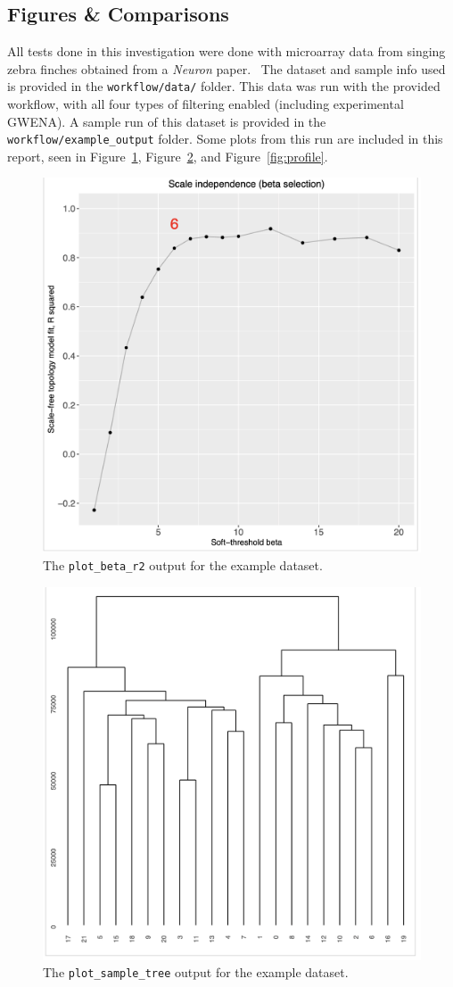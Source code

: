 \subsection{Figures \& Comparisons}
\label{subsec: comparisons}
All tests done in this investigation were done with microarray data from singing zebra finches obtained from a \emph{Neuron} paper.~\cite{dataset} The dataset and sample info used is provided in the \texttt{workflow/data/} folder. This data was run with the provided workflow, with all four types of filtering enabled (including experimental GWENA). A sample run of this dataset is provided in the \texttt{workflow/example\_output} folder. Some plots from this run are included in this report, seen in Figure~\ref{fig:beta_r2}, Figure~\ref{fig:sample_tree}, and Figure~\ref{fig:profile}.

\begin{figure}[!htb]
    \centering
    \includegraphics[width=0.7\linewidth]{images/beta_r2_plot}
    \caption{The \texttt{plot\_beta\_r2} output for the example dataset.}
    \label{fig:beta_r2}
\end{figure}

\begin{figure}[!htb]
    \centering
    \includegraphics[width=0.7\linewidth]{images/sample_tree_plot}
    \caption{The \texttt{plot\_sample\_tree} output for the example dataset.}
    \label{fig:sample_tree}
\end{figure}

